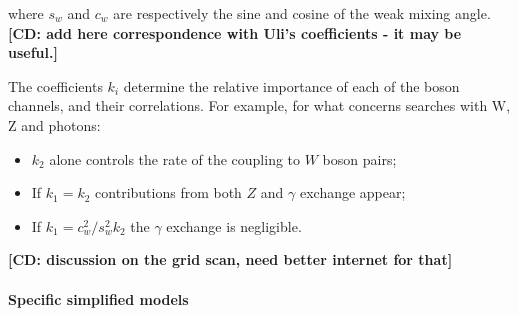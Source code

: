 where $s_w$ and $c_w$ are respectively the sine and cosine of the weak mixing angle. 
\textbf{[CD: add here correspondence with Uli's coefficients - it may be useful.]}

The coefficients $k_i$ determine the relative importance of each of the boson channels,
and their correlations. For example, for what concerns searches with W, Z and photons: 
\begin{itemize}
 \item $k_2$ alone controls the rate of the coupling to $W$ boson pairs;
 \item If $k_1 = k_2$ contributions from both $Z$ and $\gamma$ exchange appear;
 \item If $k_1 = c_w^2 / s_w^2 k_2$ the $\gamma$ exchange is negligible. 
\end{itemize}

\textbf{[CD: discussion on the grid scan, need better internet for that]}


\paragraph{Specific simplified models}



